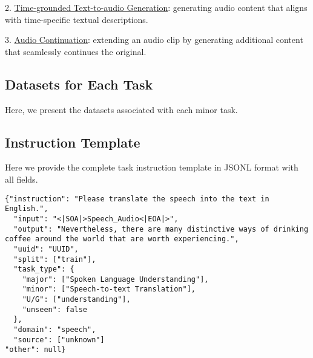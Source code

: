2. \underline{Time-grounded Text-to-audio Generation}: generating audio content that aligns with time-specific textual descriptions.

3. \underline{Audio Continuation}: extending an audio clip by generating additional content that seamlessly continues the original.


\subsection{Datasets for Each Task}
Here, we present the datasets associated with each minor task.
% 
% 




% 
\subsection{Instruction Template}
\label{appendix:instruction_template}
Here we provide the complete task instruction template in JSONL format with all fields. 




\begin{tcolorbox}[colback=white, colframe=black, boxrule=0.2mm, arc=0mm, title=Speech-to-Text Translation]
\begin{lstlisting}[basicstyle=\ttfamily, breaklines=true]
{"instruction": "Please translate the speech into the text in English.", 
  "input": "<|SOA|>Speech_Audio<|EOA|>", 
  "output": "Nevertheless, there are many distinctive ways of drinking coffee around the world that are worth experiencing.", 
  "uuid": "UUID", 
  "split": ["train"], 
  "task_type": {
    "major": ["Spoken Language Understanding"], 
    "minor": ["Speech-to-text Translation"], 
    "U/G": ["understanding"], 
    "unseen": false
  }, 
  "domain": "speech", 
  "source": ["unknown"]
"other": null}
\end{lstlisting}
\end{tcolorbox}

